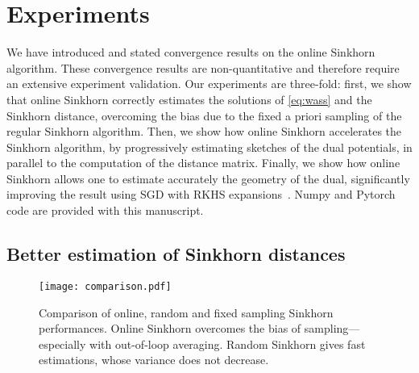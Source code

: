 \section{Experiments}\label{sec:exps}

We have introduced and stated convergence results on the online Sinkhorn
algorithm. These convergence results are non-quantitative and therefore require
an extensive experiment validation. Our experiments are three-fold: first, we
show that online Sinkhorn correctly estimates the solutions of
\eqref{eq:wass} and the Sinkhorn distance, overcoming the bias due to the fixed
a priori sampling of the regular Sinkhorn algorithm. Then, we show how online
Sinkhorn accelerates the Sinkhorn algorithm, by progressively estimating
sketches of the dual potentials, in parallel to the computation of the distance
matrix. Finally, we show how online Sinkhorn allows one to estimate accurately
the geometry of the dual, significantly improving the result using SGD with RKHS
expansions~\citep{2016-genevay-nips}. Numpy and Pytorch code are provided with
this manuscript.

\subsection{Better estimation of Sinkhorn distances}\label{sec:exp1}

\begin{figure}[t]
    \centering
    \texttt{[image: comparison.pdf]}

    \vspace{-1em}

    \caption{Comparison of online, random and fixed sampling Sinkhorn performances. Online Sinkhorn overcomes the bias of sampling---especially with out-of-loop averaging. Random Sinkhorn gives fast estimations, whose variance does not decrease.}
    \label{fig:convergence}
\end{figure}


